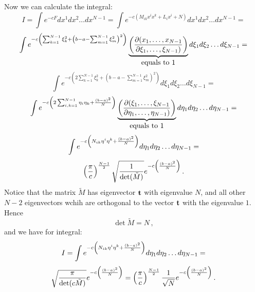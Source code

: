 Now we can calculate the integral:    
 $$
I=
\int e^{-cF}dx^1dx^2\dots dx^{N-1}=
\int e^{-c\left(M_{ik}x^ix^k+L_ix^i+N\right)}dx^1dx^2\dots dx^{N-1}=       $$
    $$
\int e^{-c\left(
\sum_{k=1}^{N-1}\xi_k^2+\left(b-a-\sum_{m=1}^{N-1}\xi_m^2 
\right)^2\right)}
    \underbrace
    {
  \left(\partial(x_1,\dots,x_{N-1}\over \partial\xi_1,\dots,\xi_{N-1})\right)
        }_{\hbox {equals to $1$}}
d\xi_1d\xi_2\dots d\xi_{N-1}=      
    $$
      $$
\int e^{-c\left(
2\sum_{k=1}^{N-1}\xi_k^2+\left(b-a-\sum_{m=1}^{N-1}\xi_m^2 
\right)^2\right)}
d\xi_1d\xi_2\dots d\xi_{N-1}=      
    $$
      $$
\int e^{
      -c\left(
2\sum_{i,k=1}^{N-1}\eta_i\eta_k+{(b-a)^2\over N}
        \right)
            }
    \underbrace
    {
  \left(
 \partial(\xi_1,\dots,\xi_{N-1}\over \partial\eta_1,\dots,\eta_{N-1})
\right)
        }_{\hbox {equals to $1$}}
d\eta_1d\eta_2\dots d\eta_{N-1}=      
    $$
      $$
\int e^{
      -c\left(
N_{ik}\eta^i\eta^k+{(b-a)^2\over N}
        \right)
            }
d\eta_1d\eta_2\dots d\eta_{N-1}=      
    $$
      $$
\left(\pi\over c\right)^{N-1\over 2}
\sqrt {1\over \det (\tilde M)}
     e^{
      -c\left(
{(b-a)^2\over N}
        \right)
            }\,.
        $$
Notice that  the matrix $\tilde M$ has eigenvector $\bf t$
with eigenvalue $N$, and all other $N-2$ eigenvectors
wchih are orthogonal to the vector $\bf t$
with the eigenvalue $1$. Hence
   $$
\det {\tilde M}=N\,,
  $$
and we have for integral:
      $$
I=\int e^{
      -c\left(
N_{ik}\eta^i\eta^k+{(b-a)^2\over N}
        \right)
            }
d\eta_1d\eta_2\dots d\eta_{N-1}=      
    $$
      $$
\sqrt {\pi\over \det (c\tilde M)}
     e^{
      -c\left(
{(b-a)^2\over N}
        \right)
            }=
 \left(\pi\over c\right)^{N-1\over 2}
   {1\over \sqrt N}
     e^{
      -c\left(
{(b-a)^2\over N}
        \right)
            }\,.
        $$


\bye
